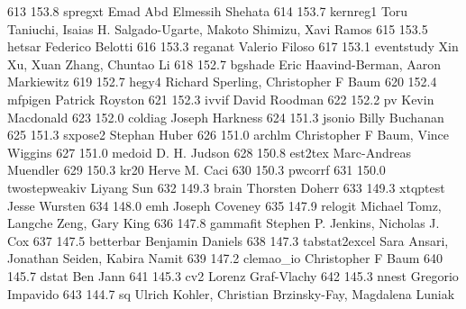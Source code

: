    613    153.8    spregxt       Emad Abd Elmessih Shehata               
   614    153.7    kernreg1      Toru Taniuchi, Isaias H.                
                                   Salgado-Ugarte, Makoto Shimizu, Xavi    
                                   Ramos                                   
   615    153.5    hetsar        Federico Belotti                        
   616    153.3    reganat       Valerio Filoso                          
   617    153.1    eventstudy    Xin Xu, Xuan Zhang, Chuntao Li          
   618    152.7    bgshade       Eric Haavind-Berman, Aaron Markiewitz   
   619    152.7    hegy4         Richard Sperling, Christopher F Baum    
   620    152.4    mfpigen       Patrick Royston                         
   621    152.3    ivvif         David Roodman                           
   622    152.2    pv            Kevin Macdonald                         
   623    152.0    coldiag       Joseph Harkness                         
   624    151.3    jsonio        Billy Buchanan                          
   625    151.3    sxpose2       Stephan Huber                           
   626    151.0    archlm        Christopher F Baum, Vince Wiggins       
   627    151.0    medoid        D. H. Judson                            
   628    150.8    est2tex       Marc-Andreas Muendler                   
   629    150.3    kr20          Herve M. Caci                           
   630    150.3    pwcorrf                                               
   631    150.0    twostepweakiv  Liyang Sun                              
   632    149.3    brain         Thorsten Doherr                         
   633    149.3    xtqptest      Jesse Wursten                           
   634    148.0    emh           Joseph Coveney                          
   635    147.9    relogit       Michael Tomz, Langche Zeng, Gary King   
   636    147.8    gammafit      Stephen P. Jenkins, Nicholas J. Cox     
   637    147.5    betterbar     Benjamin Daniels                        
   638    147.3    tabstat2excel  Sara Ansari, Jonathan Seiden, Kabira    
                                   Namit                                   
   639    147.2    clemao_io     Christopher F Baum                      
   640    145.7    dstat         Ben Jann                                
   641    145.3    cv2           Lorenz Graf-Vlachy                      
   642    145.3    nnest         Gregorio Impavido                       
   643    144.7    sq            Ulrich Kohler, Christian Brzinsky-Fay,  
                                   Magdalena Luniak                        
